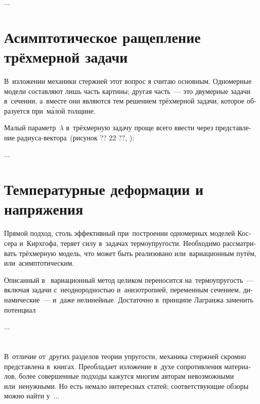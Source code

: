 \begin{otherlanguage}{russian}
...



\section{Асимптотическое ращепление трёхмерной задачи}

В~изложении механики стержней этот вопрос я считаю основным. Одномерные модели составляют лишь часть картины; другая часть~--- это двумерные задачи в~сечении, а~вместе они являются тем решением трёхмерной задачи, которое образуется при~м\'{а}лой толщине.

Малый параметр~$\lambda$ в~трёхмерную задачу проще всего ввести через представление радиуса\hbox{-}вектора~(рисунок ?? 22 ??, ):

...



\section{Температурные деформации и напряжения}

Прямой подход, столь эффективный при~построении одномерных моделей Коссера и~Кирхгофа, теряет силу в~задачах термоупругости. Необходимо рассматривать трёхмерную модель, что может быть реализовано или~вариационным путём, или~асимптотическим.

Описанный в~ вариационный метод целиком переносится на~термоупругость~--- включая задачи с~неоднородностью и~анизотропией, переменным сечением, динамические~--- и~даже нелинейные. Достаточно в~принципе Лагранжа заменить потенциал

...




\vspace{8mm}
\hfill\begin{minipage}[b]{0.95\linewidth}
\fontsize{10}{12}\selectfont

\section*{\wordforbibliography}

В~отличие от~других разделов теории упругости, механика стержней скромно представлена в~книгах. Преобладает изложение в~духе сопротивления материалов, более совершенные подходы кажутся многим авторам невозможными или~ненужными. Но есть немало интересных статей; соответствующие обзоры можно найти у~...

\end{minipage}

\end{otherlanguage}
